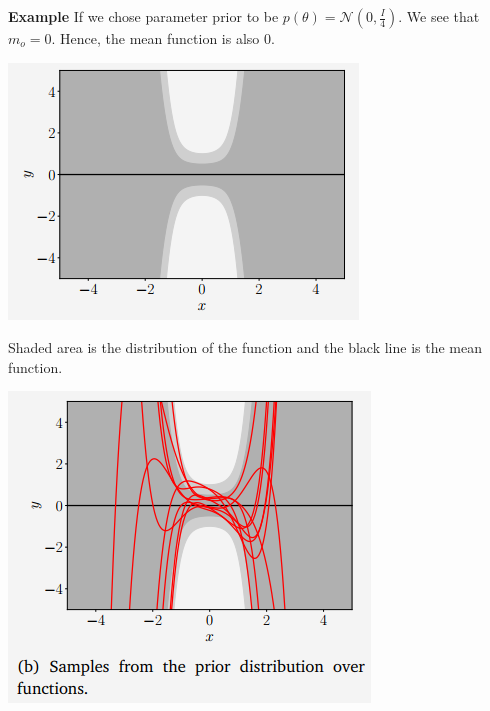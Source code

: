 \documentclass[12pt]{article}
\numberwithin{equation}{section}
\begin{document}
{\textbf{Example} If we chose parameter prior to be $p(\theta) = \mathcal{N}(0, \frac{I}{4})$. We see that $m_o = 0$. Hence, the mean function is also $0$.
\begin{center}
	\includegraphics{graph15}
\end{center}
Shaded area is the distribution of the function and the black line is the mean function.
\begin{center}
	\includegraphics{graph16}
\end{center}
}
\end{document}
